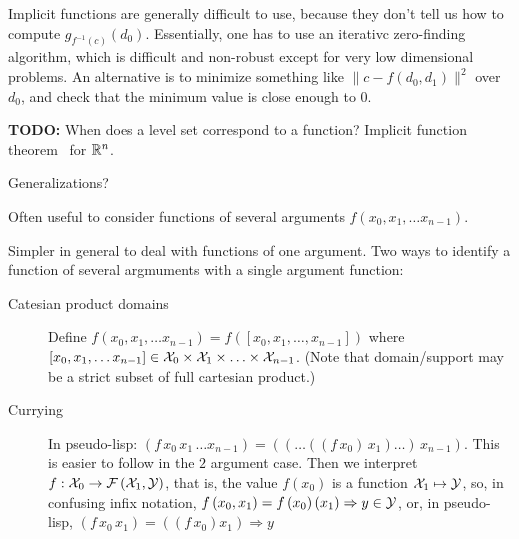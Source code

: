 Implicit functions are generally difficult to use,
because they don't tell us how to compute 
$g_{f^{-1}(c)} \left( d_0 \right)$.
Essentially, one has to use an iterativc zero-finding 
algorithm, which is difficult and non-robust except
for very low dimensional problems.
An alternative is to minimize something like
$\| c - f\left( d_0, d_1 \right) \|^2$ over $d_0$,
and check that the minimum value is close enough to $0$.

\textbf{TODO:} When does a level set correspond to a function?
Implicit function theorem~\cite[Theorem~2-2]{spivak-1965}
for $\mathbb{R}^n$. 

Generalizations?~\cite{wiki:Implicit-function-theorem,
wiki:Inverse-function-theorem}

\label{sec:Multiple-arguments}

Often useful to consider 
functions of several arguments
$f \left( x_0, x_1, \ldots x_{n-1}\right)$.

Simpler in general to deal with functions of one argument.
Two ways to identify a function of several argmuments
with a single argument function:
\begin{description}
\item[Catesian product domains]
Define $f \left( x_0, x_1, \ldots x_{n-1} \right) 
= f \left( \left[x_0, x_1, \ldots , x_{n-1} \right]\right)$
where $\left[x_0, x_1, \ldots x_{n-1} \right] \in
\mathcal{X}_0 \times \mathcal{X}_1 \times \ldots \times \mathcal{X}_{n-1}$. 
(Note that domain/support may be a strict subset of full cartesian 
product.)
\item[Currying]
In pseudo-lisp: $\left(f \, x_0 \, x_1 \, \ldots x_{n-1} \right) 
= 
\left(
\left(
\ldots 
\left( 
\left( 
f 
\, x_0 
\right) 
\, x_1
\right) 
\ldots 
\right) 
\, x_{n-1}
\right) 
$.
This is easier to follow in the $2$ argument case.
Then we interpret $f : \mathcal{X}_0 \rightarrow 
\mathcal{F}\left(\mathcal{X}_1, \mathcal{Y} \right)$,
that is, the value $f \left( x_0 \right)$ is a function 
$\mathcal{X}_1 \mapsto \mathcal{Y}$,
so, in confusing infix notation,
$f \left( x_0 , x_1 \right) = 
f \left( x_0 \right) \left( x_1 \right) \Rightarrow y \in \mathcal{Y}$,
or, in pseudo-lisp, 
$\left( f \, x_0 \, x_1 \right) = \left( \left( f \, x_0 \right) x_1 \right) \Rightarrow y$
\end{description}




